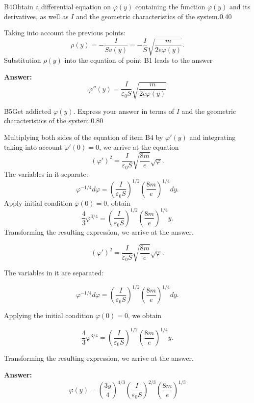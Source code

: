 \documentclass[11pt,a4paper]{article}
\begin{document}
\begin{solcard}{B4}{Obtain a differential equation on $\varphi(y)$ containing the function $\varphi(y)$ and its derivatives, as well as $I$ and the geometric characteristics of the system.}{0.40}

Taking into account the previous points: $$\rho(y) = -\frac{I}{S v(y)} = -\frac{I}{S} \sqrt{\frac{m}{2e\varphi(y)}}.$$Substitution $\rho(y)$ into the equation of point B1 leads to the answer

\par\smallskip\noindent\textbf{Answer:} $$\varphi''(y) = \dfrac{I}{\varepsilon_0S}\sqrt{\dfrac{m}{2e\varphi(y)}}$$
\end{solcard}

\begin{solcard}{B5}{Get addicted $\varphi(y)$. Express your answer in terms of $I$ and the geometric characteristics of the system.}{0.80}

Multiplying both sides of the equation of item B4 by $\varphi'(y)$ and integrating taking into account $\varphi'(0) = 0$, we arrive at the equation $$(\varphi')^2 = \dfrac{I}{\varepsilon_0S}\sqrt{\dfrac{8m}{e}} \sqrt{\varphi}.$$ The variables in it separate: $$\varphi^{-1/4}d\varphi = \left(\dfrac{I}{\varepsilon_0S}\right)^{1/2}\left(\dfrac{8m}{e}\right)^{1/4}dy.$$ Apply initial condition $\varphi(0) = 0$, obtain $$\dfrac{4}{3}\varphi^{3/4} = \left(\dfrac{I}{\varepsilon_0S}\right)^{1/2}\left(\dfrac{8m}{e}\right)^{1/4}y.$$ Transforming the resulting expression, we arrive at the answer.


$$(\varphi')^2 = \dfrac{I}{\varepsilon_0S}\sqrt{\dfrac{8m}{e}} \sqrt{\varphi}.$$


The variables in it are separated:


$$\varphi^{-1/4}d\varphi = \left(\dfrac{I}{\varepsilon_0S}\right)^{1/2}\left(\dfrac{8m}{e}\right)^{1/4}dy.$$


Applying the initial condition $\varphi(0) = 0$, we obtain


$$\dfrac{4}{3}\varphi^{3/4} = \left(\dfrac{I}{\varepsilon_0S}\right)^{1/2}\left(\dfrac{8m}{e}\right)^{1/4}y.$$


Transforming the resulting expression, we arrive at the answer.

\par\smallskip\noindent\textbf{Answer:} \[\varphi(y) =\left(\dfrac{3y}{4}\right) ^{4/3} \left(\dfrac{I}{\varepsilon_0S}\right)^{2/3}\left(\dfrac{8m}{e}\right)^{1/3}\]
\end{solcard}
\end{document}
